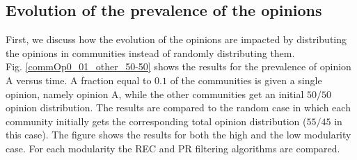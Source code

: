 \documentclass[11 pt , letterpaper , twoside , openright]{book}
\begin{document}
\subsection{Evolution of the prevalence of the opinions}\label{groupVSrandomOP}

First, we discuss how the evolution of the opinions are impacted by distributing the opinions in communities instead of randomly distributing them.\\
\newline
Fig. \ref{commOp0_01_other_50-50} shows the results for the prevalence of opinion A versus time. A fraction equal to $0.1$ of the communities is given a single opinion, namely opinion A, while the other communities get an initial $50/50$ opinion distribution. The results are compared to the random case in which each community initially gets the corresponding total opinion distribution ($55/45$ in this case). The figure shows the results for both the high and the low modularity case. For each modularity the REC and PR filtering algorithms are compared.
\end{document}
